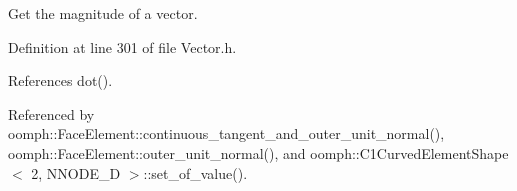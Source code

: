 Get the magnitude of a vector. 



Definition at line 301 of file Vector.\+h.



References dot().



Referenced by oomph\+::\+Face\+Element\+::continuous\+\_\+tangent\+\_\+and\+\_\+outer\+\_\+unit\+\_\+normal(), oomph\+::\+Face\+Element\+::outer\+\_\+unit\+\_\+normal(), and oomph\+::\+C1\+Curved\+Element\+Shape$<$ 2, N\+N\+O\+D\+E\+\_\+D $>$\+::set\+\_\+of\+\_\+value().

